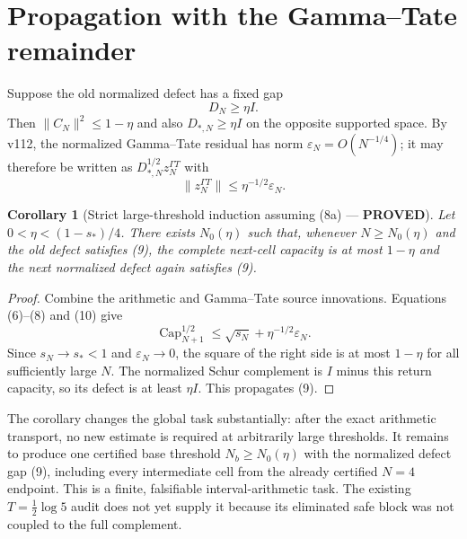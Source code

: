 \documentclass[11pt]{article}
\newcommand{\PROVED}{\textcolor{green!40!black}{\textbf{PROVED}}}
\newtheorem{corollary}{Corollary}
\begin{document}
\section{Propagation with the Gamma--Tate remainder}

Suppose the old normalized defect has a fixed gap
\begin{equation}
                              D_N\ge\eta I.                    \tag{9}
\end{equation}
Then $\|C_N\|^2\le1-\eta$ and also $D_{*,N}\ge\eta I$ on the
opposite supported space.  By v112, the normalized Gamma--Tate residual
has norm $\varepsilon_N=O(N^{-1/4})$; it may therefore be written as
$D_{*,N}^{1/2}z_N^{\Gamma T}$ with
\begin{equation}
                    \|z_N^{\Gamma T}\|
 \le\eta^{-1/2}\varepsilon_N.                                \tag{10}
\end{equation}

\begin{corollary}[Strict large-threshold induction assuming (8a) --- \PROVED]
Let $0<\eta<(1-s_*)/4$.  There exists $N_0(\eta)$ such that, whenever
$N\ge N_0(\eta)$ and the old defect satisfies (9), the complete next-cell
capacity is at most $1-\eta$ and the next normalized defect again satisfies
(9).
\end{corollary}

\begin{proof}
Combine the arithmetic and Gamma--Tate source innovations.  Equations
(6)--(8) and (10) give
\begin{equation}
 \operatorname{Cap}_{N+1}^{1/2}
 \le\sqrt{s_N}+\eta^{-1/2}\varepsilon_N.                      \tag{11}
\end{equation}
Since $s_N\to s_*<1$ and $\varepsilon_N\to0$, the square of the right
side is at most $1-\eta$ for all sufficiently large $N$.  The normalized
Schur complement is $I$ minus this return capacity, so its defect is at
least $\eta I$.  This propagates (9).
\end{proof}

The corollary changes the global task substantially: after the exact
arithmetic transport, no new estimate is required at arbitrarily large
thresholds.  It remains to produce one certified base threshold
$N_b\ge N_0(\eta)$ with the normalized defect gap (9), including every
intermediate cell from the already certified $N=4$ endpoint.  This is a
finite, falsifiable interval-arithmetic task.  The existing
$T=\tfrac12\log5$ audit does not yet supply it because its eliminated safe
block was not coupled to the full complement.
\end{document}
